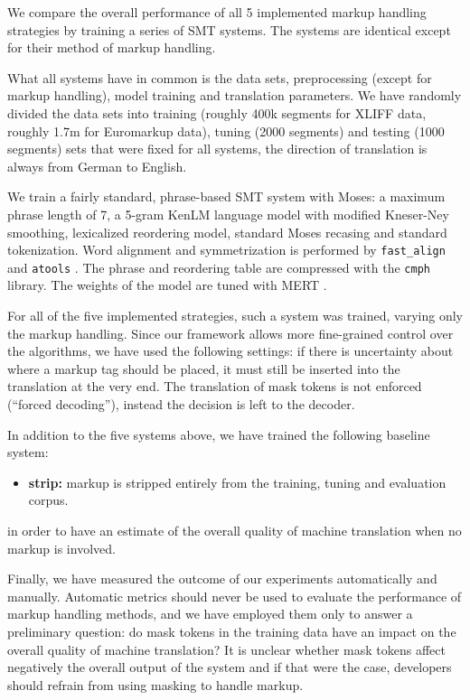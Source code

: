\documentclass[11pt,letterpaper]{article}
\begin{document}
We compare the overall performance of all 5 implemented markup handling strategies by training a series of SMT systems. The systems are identical except for their method of markup handling.

What all systems have in common is the data sets, preprocessing (except for markup handling), model training and translation parameters. We have randomly divided the data sets into training (roughly 400k segments for XLIFF data, roughly 1.7m for Euromarkup data), tuning (2000 segments) and testing (1000 segments) sets that were fixed for all systems, the direction of translation is always from German to English.

We train a fairly standard, phrase-based SMT system with Moses: a maximum phrase length of 7, a 5-gram KenLM language model with modified Kneser-Ney smoothing, lexicalized reordering model, standard Moses recasing and standard tokenization. Word alignment and symmetrization is performed by \texttt{fast\_align} and \texttt{atools} \cite{dyer2013simple}. The phrase and reordering table are compressed with the \texttt{cmph} library. The weights of the model are tuned with MERT \cite{mert}.

For all of the five implemented strategies, such a system was trained, varying only the markup handling. Since our framework allows more fine-grained control over the algorithms, we have used the following settings: if there is uncertainty about where a markup tag should be placed, it must still be inserted into the translation at the very end. The translation of mask tokens is not enforced (``forced decoding''), instead the decision is left to the decoder.

In addition to the five systems above, we have trained the following baseline system:

\begin{itemize}
\item \textbf{strip:} markup is stripped entirely from the training, tuning and evaluation corpus.
\end{itemize}

\noindent in order to have an estimate of the overall quality of machine translation when no markup is involved.

Finally, we have measured the outcome of our experiments automatically and manually. Automatic metrics should never be used to evaluate the performance of markup handling methods, and we have employed them only to answer a preliminary question: do mask tokens in the training data have an impact on the overall quality of machine translation? It is unclear whether mask tokens affect negatively the overall output of the system and if that were the case, developers should refrain from using masking to handle markup.
\end{document}
